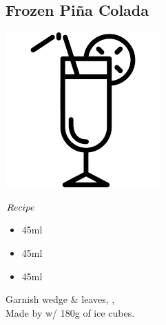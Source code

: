 \subsection{Frozen Pi\~{n}a Colada}
\vspace{-7.4mm}
\hspace{54mm}
\includegraphics[scale=.07]{cocktail_glass_tall.png}
\vspace{2.5mm}
\begin{itembox}[l]{\boldmath $Recipe$}
\begin{itemize}
\setlength{\parskip}{0cm}
\setlength{\itemsep}{0cm}
\item \lrum 45ml
\item \pj 45ml
\item \cococ 45ml
\end{itemize}
\vspace{-4mm}
Garnish \pineapple wedge \& leaves, \cherry, \umbrella\\
Made by \blend w/ 180g of ice cubes.
\end{itembox}
